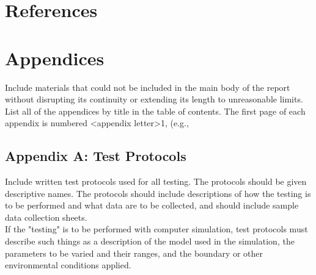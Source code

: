 \documentclass[12pt,a4paper]{report}
\begin{document}
\setcounter{section}{8}
\section{References}
\begingroup
   \def\chapter*#1{}
   
	
\endgroup	

 

\section{Appendices}
Include materials that could not be included in the main body of the report without disrupting its continuity or extending its length to unreasonable limits.  List all of the appendices by title in the table of contents.  
%
The first page of each appendix is numbered <appendix letter>1, (e.g., 
%
\subsection{Appendix A: Test Protocols}
Include written test protocols used for all testing.  The protocols should be given descriptive names. The protocols should include descriptions of how the testing is to be performed and what data are to be collected, and should include sample data collection sheets.\\
If the "testing" is to be performed with computer simulation, test protocols must describe such things as a description of the model used in the simulation, the parameters to be varied and their ranges, and the boundary or other environmental conditions applied.\\
%
%
\end{document}
